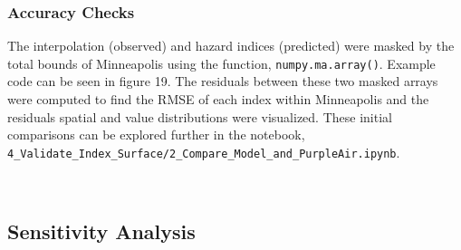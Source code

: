 \documentclass[article,12pt]{article}
\numberwithin{equation}{section}
\begin{document}
\subsubsection{Accuracy Checks}

The interpolation (observed) and hazard indices (predicted) were masked by the total bounds of Minneapolis using the function, \texttt{numpy.ma.array()}. Example code can be seen in figure 19. The residuals between these two masked arrays were computed to find the RMSE of each index within Minneapolis and the residuals spatial and value distributions were visualized. These initial comparisons can be explored further in the notebook, \newline \texttt{4\_Validate\_Index\_Surface/2\_Compare\_Model\_and\_PurpleAir.ipynb}. 
\vspace{.5in}
\begin{adjustwidth}{-.88in}{-.88in}
	\begin{center}
		\\
		
	\end{center}
\end{adjustwidth}
\vspace{.5in}

\subsection{Sensitivity Analysis}
\begin{adjustwidth}{-.88in}{-.88in}
	\begin{center}
		\\
		
	\end{center}
\end{adjustwidth}
\vspace{.5in}
\end{document}
